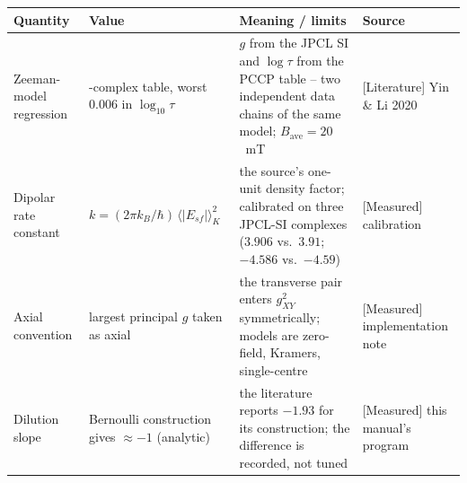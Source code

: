 \begin{center}
\begin{tabularx}{\textwidth}{@{}>{\raggedright\arraybackslash}p{3.2cm} >{\raggedright\arraybackslash}p{3.4cm} X >{\raggedright\arraybackslash}p{2.6cm}@{}}
\toprule
Quantity & Value & Meaning / limits & Source \\
\midrule
Zeeman-model regression & 18-complex table, worst 0.006 in $\log_{10}\tau$ &
  $g$ from the JPCL SI and $\log\tau$ from the PCCP table -- two independent
  data chains of the same model; $B_{\mathrm{ave}} = 20$~mT & \textsf{[Literature]} Yin \& Li 2020 \\
Dipolar rate constant & $k = (2\pi k_B/\hbar)\,\langle|E_{sf}|\rangle_K^2$ &
  the source's one-unit density factor; calibrated on three JPCL-SI
  complexes ($3.906$ vs.\ $3.91$; $-4.586$ vs.\ $-4.59$) & \textsf{[Measured]} calibration \\
Axial convention & largest principal $g$ taken as axial & the transverse pair
  enters $g_{XY}^2$ symmetrically; models are zero-field, Kramers,
  single-centre & \textsf{[Measured]} implementation note \\
Dilution slope & Bernoulli construction gives $\approx -1$ (analytic) &
  the literature reports $-1.93$ for its construction; the difference is
  recorded, not tuned & \textsf{[Measured]} this manual's program \\
\bottomrule
\end{tabularx}
\end{center}
